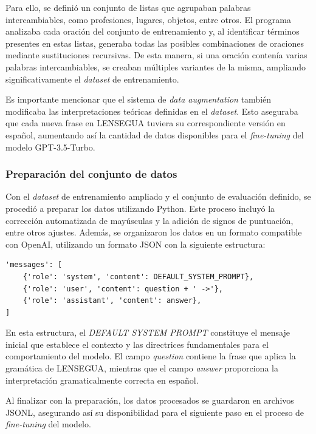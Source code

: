 Para ello, se definió un conjunto de listas que agrupaban palabras intercambiables, como profesiones, lugares, objetos, entre otros. El programa analizaba cada oración del conjunto de entrenamiento y, al identificar términos presentes en estas listas, generaba todas las posibles combinaciones de oraciones mediante sustituciones recursivas. De esta manera, si una oración contenía varias palabras intercambiables, se creaban múltiples variantes de la misma, ampliando significativamente el \textit{dataset} de entrenamiento.

Es importante mencionar que el sistema de \textit{data augmentation} también modificaba las interpretaciones teóricas definidas en el \textit{dataset}. Esto aseguraba que cada nueva frase en LENSEGUA tuviera su correspondiente versión en español, aumentando así la cantidad de datos disponibles para el \textit{fine-tuning} del modelo GPT-3.5-Turbo.


\subsubsection{Preparación del conjunto de datos}

Con el \textit{dataset} de entrenamiento ampliado y el conjunto de evaluación definido, se procedió a preparar los datos utilizando Python. Este proceso incluyó la corrección automatizada de mayúsculas y la adición de signos de puntuación, entre otros ajustes. Además, se organizaron los datos en un formato compatible con OpenAI, utilizando un formato JSON con la siguiente estructura:

\vspace{0.5cm}
\begin{lstlisting}
'messages': [
    {'role': 'system', 'content': DEFAULT_SYSTEM_PROMPT},
    {'role': 'user', 'content': question + ' ->'},
    {'role': 'assistant', 'content': answer},
]
\end{lstlisting}
\vspace{0.3cm}

En esta estructura, el \textit{DEFAULT SYSTEM PROMPT} constituye el mensaje inicial que establece el contexto y las directrices fundamentales para el comportamiento del modelo. El campo \textit{question} contiene la frase que aplica la gramática de LENSEGUA, mientras que el campo \textit{answer} proporciona la interpretación gramaticalmente correcta en español. 

Al finalizar con la preparación, los datos procesados se guardaron en archivos JSONL, asegurando así su disponibilidad para el siguiente paso en el proceso de \textit{fine-tuning} del modelo. 



